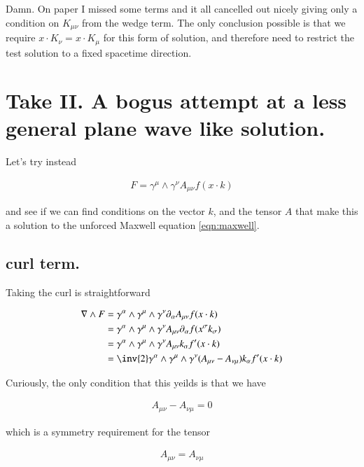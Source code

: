 \documentclass{article}
\begin{document}
Damn.  On paper I missed some terms and it all cancelled out nicely giving only a condition on $K_{\mu\nu}$ from the wedge term.  The only
conclusion possible is that we require $x \cdot K_\nu = x \cdot K_\mu$ for this form of solution, and therefore need to restrict the
test solution to a fixed spacetime direction.

\section{ Take II.  A bogus attempt at a less general plane wave like solution. }

Let's try instead

\begin{align}\label{eqn:solutionTensor}
F = \gamma^\mu \wedge \gamma^\nu A_{\mu\nu} f( x \cdot k )
\end{align}

and see if we can find conditions on the vector $k$, and the tensor $A$ that make this a solution to the unforced Maxwell equation \ref{eqn:maxwell}.

\subsection{ curl term. }

Taking the curl is straightforward

\begin{align}
\grad \wedge F 
&= \gamma^\alpha \wedge \gamma^\mu \wedge \gamma^\nu \partial_\alpha A_{\mu\nu} f( x \cdot k ) \\
&= \gamma^\alpha \wedge \gamma^\mu \wedge \gamma^\nu A_{\mu\nu} \partial_\alpha f( x^\sigma k_\sigma ) \\
&= \gamma^\alpha \wedge \gamma^\mu \wedge \gamma^\nu A_{\mu\nu} k_\alpha f'( x \cdot k ) \\
&= \inv{2} \gamma^\alpha \wedge \gamma^\mu \wedge \gamma^\nu (A_{\mu\nu} - A_{\nu\mu} ) k_\alpha f'( x \cdot k ) \\
\end{align}

Curiously, the only condition that this yeilds is that we have

\begin{align*}
A_{\mu\nu} - A_{\nu\mu} = 0
\end{align*}

which is a symmetry requirement for the tensor

\begin{align*}
A_{\mu\nu} = A_{\nu\mu}
\end{align*}
\end{document}
